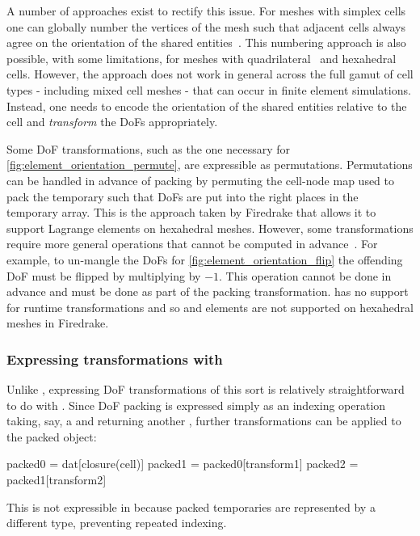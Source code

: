\documentclass[thesis]{subfiles}
\begin{document}
A number of approaches exist to rectify this issue.
For meshes with simplex cells one can globally number the vertices of the mesh such that adjacent cells always agree on the orientation of the shared entities~\cite{rognesEfficientAssemblyDiv2010}.
This numbering approach is also possible, with some limitations, for meshes with quadrilateral~\cite{homolyaParallelEdgeOrientation2016} and hexahedral~\cite{agelekOrientingEdgesUnstructured2017} cells.
However, the approach does not work in general across the full gamut of cell types - including mixed cell meshes - that can occur in finite element simulations.
Instead, one needs to encode the orientation of the shared entities relative to the cell and \emph{transform} the DoFs appropriately.

Some DoF transformations, such as the one necessary for \cref{fig:element_orientation_permute}, are expressible as permutations.
Permutations can be handled in advance of packing by permuting the cell-node map used to pack the temporary such that DoFs are put into the right places in the temporary array.
This is the approach taken by Firedrake that allows it to support Lagrange elements on hexahedral meshes.
However, some transformations require more general operations that cannot be computed in advance~\cite{scroggsBasixRuntimeFinite2022,scroggsConstructionArbitraryOrder2021}.
For example, to un-mangle the DoFs for \cref{fig:element_orientation_flip} the offending DoF must be flipped by multiplying by $-1$.
This operation cannot be done in advance and must be done as part of the packing transformation.
 has no support for runtime transformations and so \hdiv and \hcurl elements are not supported on hexahedral meshes in Firedrake.

\subsubsection{Expressing transformations with }

Unlike , expressing DoF transformations of this sort is relatively straightforward to do with .
Since DoF packing is expressed simply as an indexing operation taking, say, a  and returning another , further transformations can be applied to the packed object:
\begin{pyinline}
  packed0 = dat[closure(cell)]
  packed1 = packed0[transform1]
  packed2 = packed1[transform2]
\end{pyinline}
This is not expressible in  because packed temporaries are represented by a different type, preventing repeated indexing.
\end{document}
